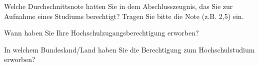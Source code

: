 \separate

\begin{choicequestion}[3]{Welche Durchschnittsnote hatten Sie in dem Abschlusszeugnis, das Sie zur Aufnahme eines Studiums berechtigt?
\newline\footnotesize{Tragen Sie bitte die Note (z.B. 2,5) ein.}}
\end{choicequestion}

\separate


\begin{choicequestion}[3]{Wann haben Sie Ihre Hochschulzugangsberechtigung erworben?}
\end{choicequestion}

\separate

\begin{choicequestion}[1]{In welchem Bundesland/Land haben Sie die Berechtigung zum Hochschulstudium erworben?}
\end{choicequestion}

\separate


\separate


\separate
